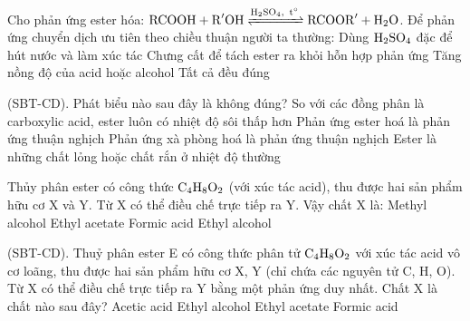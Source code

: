 \documentclass[12pt,a4paper]{article}
\begin{document}
\begin{ex}
Cho phản ứng ester hóa: $\ce{RCOOH + R^{\prime}OH <=>[\ce{H2SO4},\, t^\circ] RCOOR^{\prime} + H2O}$. Để phản ứng chuyển dịch ưu tiên theo chiều thuận người ta thường:
\choice
{Dùng $\ce{H2SO4}$ đặc để hút nước và làm xúc tác}
{Chưng cất để tách ester ra khỏi hỗn hợp phản ứng}
{Tăng nồng độ của acid hoặc alcohol}
{\True Tất cả đều đúng}
\end{ex}

\begin{ex}
(SBT-CD). Phát biểu nào sau đây là không đúng?
\choice
{So với các đồng phân là carboxylic acid, ester luôn có nhiệt độ sôi thấp hơn}
{Phản ứng ester hoá là phản ứng thuận nghịch}
{\True Phản ứng xà phòng hoá là phản ứng thuận nghịch}
{Ester là những chất lỏng hoặc chất rắn ở nhiệt độ thường}
\end{ex}

\begin{ex}
Thủy phân ester có công thức $\ce{C4H8O2}$ (với xúc tác acid), thu được hai sản phẩm hữu cơ X và Y. Từ X có thể điều chế trực tiếp ra Y. Vậy chất X là:
\choice
{Methyl alcohol}
{Ethyl acetate}
{Formic acid}
{\True Ethyl alcohol}
\end{ex}

\begin{ex}
(SBT-CD). Thuỷ phân ester E có công thức phân tử $\ce{C4H8O2}$ với xúc tác acid vô cơ loãng, thu được hai sản phẩm hữu cơ X, Y (chỉ chứa các nguyên tử C, H, O). Từ X có thể điều chế trực tiếp ra Y bằng một phản ứng duy nhất. Chất X là chất nào sau đây?
\choice
{Acetic acid}
{\True Ethyl alcohol}
{Ethyl acetate}
{Formic acid}
\end{ex}
\end{document}
